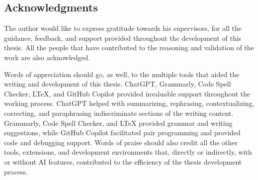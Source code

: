 \newpage

\subsection*{Acknowledgments}

The author would like to express gratitude towards his supervisors, for all the guidance, feedback, and support provided throughout the development of this thesis. All the people that have contributed to the reasoning and validation of the work are also acknowledged.

Words of appreciation should go, as well, to the multiple tools that aided the writing and development of this thesis. ChatGPT, Grammarly, Code Spell Checker, LTeX, and GitHub Copilot provided invaluable support throughout the working process. ChatGPT helped with summarizing, rephrasing, contextualizing, correcting, and paraphrasing indiscriminate sections of the writing content. Grammarly, Code Spell Checker, and LTeX provided grammar and writing suggestions, while GitHub Copilot facilitated pair programming and provided code and debugging support. Words of praise should also credit all the other tools, extensions, and development environments that, directly or indirectly, with or without AI features, contributed to the efficiency of the thesis development process.